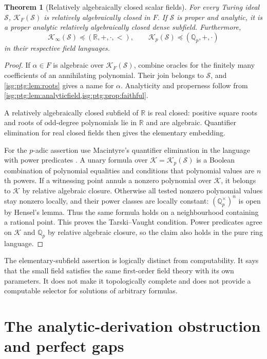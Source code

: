 \documentclass[11pt]{article}
\newtheorem{theorem}{Theorem}[section]
\theoremstyle{definition}
\theoremstyle{remark}
\newcommand{\R}{\mathbb{R}}
\newcommand{\Qp}{\mathbb{Q}_p}
\begin{document}
\begin{theorem}[Relatively algebraically closed scalar fields]\label{isg:ptg:thm:scalar}
For every Turing ideal $\mathcal S$, $\mathcal K_F(\mathcal S)$ is
relatively algebraically closed in $F$. If $\mathcal S$ is proper and
analytic, it is a proper analytic relatively algebraically closed dense
subfield. Furthermore,
\[
 \mathcal K_\infty(\mathcal S)\preccurlyeq (\R,+,\cdot,<),\qquad
 \mathcal K_p(\mathcal S)\preccurlyeq(\Qp,+,\cdot)
\]
in their respective field languages.
\end{theorem}
\begin{proof}
If $\alpha\in F$ is algebraic over $\mathcal K_F(\mathcal S)$, combine
oracles for the finitely many coefficients of an annihilating polynomial.
Their join belongs to $\mathcal S$, and \cref{isg:ptg:lem:roots} gives a
name for $\alpha$. Analyticity and properness follow from
\cref{isg:ptg:lem:analyticfield,isg:ptg:prop:faithful}.

A relatively algebraically closed subfield of $\R$ is real closed: positive
square roots and roots of odd-degree polynomials lie in $\R$ and are
algebraic. Quantifier elimination for real closed fields then gives the
elementary embedding.

For the $p$-adic assertion use Macintyre's quantifier elimination in the
language with power predicates \cite{Macintyre}. A unary formula over
$\mathcal K=\mathcal K_p(\mathcal S)$ is a Boolean combination of
polynomial equalities and conditions that polynomial values are $n$th
powers. If a witnessing point annuls a nonzero polynomial over
$\mathcal K$, it belongs to $\mathcal K$ by relative algebraic closure.
Otherwise all tested nonzero polynomial values stay nonzero locally, and
their power classes are locally constant: $(\Qp^\times)^n$ is open by
Hensel's lemma. Thus the same formula holds on a neighbourhood containing a
rational point. This proves the Tarski--Vaught condition. Power predicates
agree on $\mathcal K$ and $\Qp$ by relative algebraic closure, so the claim
also holds in the pure ring language.
\end{proof}

The elementary-subfield assertion is logically distinct from computability.
It says that the small field satisfies the same first-order field theory
with its own parameters. It does not make it topologically complete and
does not provide a computable selector for solutions of arbitrary formulas.

\section{The analytic-derivation obstruction and perfect gaps}\label{isg:ptg:sec:perfect}
\end{document}
